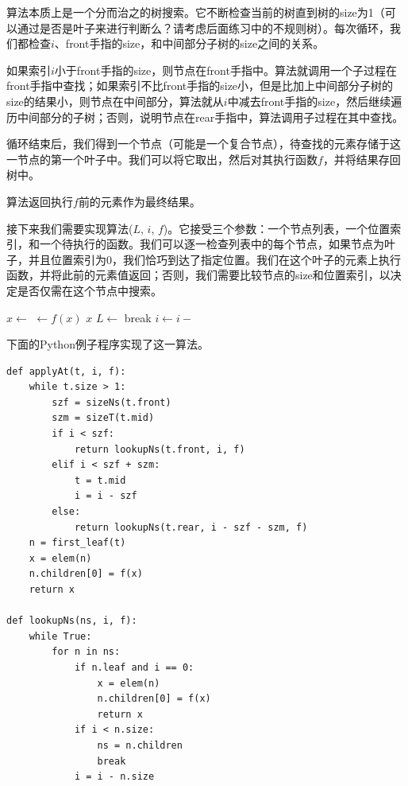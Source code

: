 \documentclass[b5paper]{ctexart}
\begin{document}
算法本质上是一个分而治之的树搜索。它不断检查当前的树直到树的size为1（可以通过是否是叶子来进行判断么？请考虑后面练习中的不规则树）。每次循环，我们都检查$i$、front手指的size，和中间部分子树的size之间的关系。

如果索引$i$小于front手指的size，则节点在front手指中。算法就调用一个子过程在front手指中查找；如果索引不比front手指的size小，但是比加上中间部分子树的size的结果小，则节点在中间部分，算法就从$i$中减去front手指的size，然后继续遍历中间部分的子树；否则，说明节点在rear手指中，算法调用子过程在其中查找。

循环结束后，我们得到一个节点（可能是一个复合节点），待查找的元素存储于这一节点的第一个叶子中。我们可以将它取出，然后对其执行函数$f$，并将结果存回树中。

算法返回执行$f$前的元素作为最终结果。

接下来我们需要实现算法($L$, $i$, $f$)。它接受三个参数：一个节点列表，一个位置索引，和一个待执行的函数。我们可以逐一检查列表中的每个节点，如果节点为叶子，并且位置索引为0，我们恰巧到达了指定位置。我们在这个叶子的元素上执行函数，并将此前的元素值返回；否则，我们需要比较节点的size和位置索引，以决定是否仅需在这个节点中搜索。

\begin{algorithmic}
  \Loop
        \State $x \gets $ 
        \State {} $\gets f(x)$
        \State \Return $x$
      \EndIf
        \State $L \gets $ 
        \State break
      \EndIf
      \State $i \gets i - $ 
    \EndFor
  \EndLoop
\EndFunction
\end{algorithmic}

下面的Python例子程序实现了这一算法。

\lstset{language=Python}
\begin{lstlisting}
def applyAt(t, i, f):
    while t.size > 1:
        szf = sizeNs(t.front)
        szm = sizeT(t.mid)
        if i < szf:
            return lookupNs(t.front, i, f)
        elif i < szf + szm:
            t = t.mid
            i = i - szf
        else:
            return lookupNs(t.rear, i - szf - szm, f)
    n = first_leaf(t)
    x = elem(n)
    n.children[0] = f(x)
    return x

def lookupNs(ns, i, f):
    while True:
        for n in ns:
            if n.leaf and i == 0:
                x = elem(n)
                n.children[0] = f(x)
                return x
            if i < n.size:
                ns = n.children
                break
            i = i - n.size
\end{lstlisting}
\end{document}
